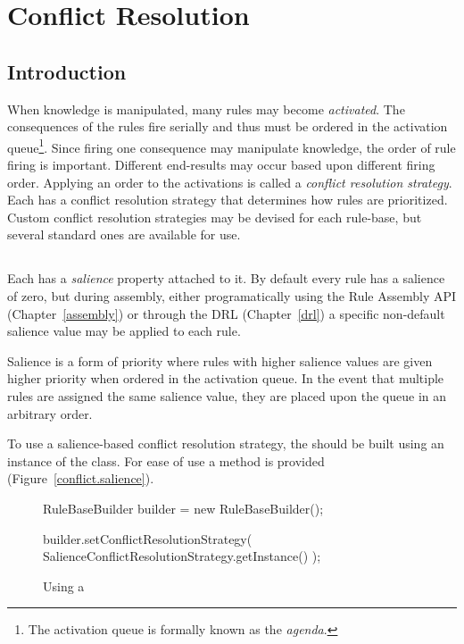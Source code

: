\chapter{Conflict Resolution}
\label{conflict}

\section{Introduction}

When knowledge is manipulated, many rules may become \emph{activated}.
The consequences of the rules fire serially and thus must be ordered
in the activation queue\footnote{The activation queue is formally
known as the \emph{agenda}.}.  Since firing one consequence may
manipulate knowledge, the order of rule firing is important. Different
end-results may occur based upon different firing order. Applying an 
order to the activations is called a \emph{conflict resolution
strategy}. Each  has a conflict resolution strategy that
determines how rules are prioritized.
Custom conflict resolution strategies may be devised for each
rule-base, but several standard ones are available for use.

\section{}

Each  has a \emph{salience} property attached
to it.  By default every rule has a salience of zero, but during
assembly, either programatically using the Rule Assembly API
(Chapter~\vref{assembly}) or through the DRL (Chapter~\vref{drl})
a specific non-default salience value may be applied to each rule.

Salience is a form of priority where rules with higher salience
values are given higher priority when ordered in the activation
queue.  In the event that multiple rules are assigned the same
salience value, they are placed upon the queue in an arbitrary
order.

To use a salience-based conflict resolution strategy, the
 should be built using an instance of
the  class.
For ease of use a
method is provided (Figure~\vref{conflict.salience}).

\begin{figure}
\begin{javaCodelisting}
RuleBaseBuilder builder = new RuleBaseBuilder();

builder.setConflictResolutionStrategy(
                            SalienceConflictResolutionStrategy.getInstance() );
\end{javaCodelisting}
\caption{Using a }
\label{conflict.salience}
\end{figure}

